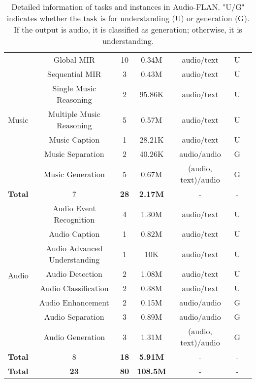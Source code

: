 \begin{table*}[h]
{\begin{tabular}{ccccccc}
    \midrule
    \multirow{7}{*}{Music} & Global MIR & 10 &  0.34M & audio/text & U \\  %
                         & Sequential MIR & 3 & 0.43M & audio/text & U \\  %
                         & Single Music Reasoning & 2 &  95.86K & audio/text & U \\  %
                         & Multiple Music Reasoning & 5 & 0.57M & audio/text & U \\
                         & Music Caption & 1 & 28.21K & audio/text & U \\
                         & Music Separation & 2 & 40.26K & audio/audio & G \\
                         & Music Generation & 5 & 0.67M & (audio, text)/audio & G \\
    \cline{2-6}
    \textbf{Total}   & 7 & \textbf{28} & \textbf{2.17M} & - & - \\
    \midrule
    \multirow{8}{*}{Audio} & Audio Event Recognition & 4 &  1.30M & audio/text & U \\
                             & Audio Caption & 1 &  0.82M & audio/text & U \\
                             & Audio Advanced Understanding & 1     &  10K   & audio/text & U \\
                             & Audio Detection & 2      &  1.08M & audio/text & U \\
                             & Audio Classification & 2 &  0.38M & audio/text & U \\
                             & Audio Enhancement & 2    &  0.15M & audio/audio & G \\
                             & Audio Separation & 3     &  0.89M & audio/audio & G \\
                             & Audio Generation & 3     &  1.31M & (audio, text)/audio & G \\
    \cline{2-6}
    \textbf{Total} & 8  & \textbf{18} & \textbf{5.91M} & - & - \\
    \midrule
    \midrule
     \textbf{Total} & \textbf{23} & \textbf{80} &  \textbf{108.5M} &  - & - \\
    \bottomrule
  \end{tabular}
  }
  \caption{Detailed information of tasks and instances in Audio-FLAN. "U/G" indicates whether the task is for understanding (U) or generation (G). If the output is audio, it is classified as generation; otherwise, it is understanding.}  %
  \vspace{-15pt}
  \label{tab:task_and_instances}  %
\end{table*}


